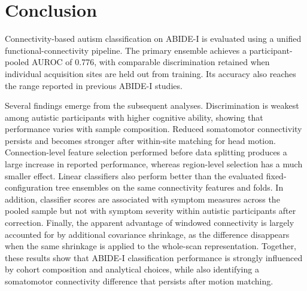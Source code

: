 \section{Conclusion}
\label{sec:conclusion}

Connectivity-based autism classification on ABIDE-I is evaluated using a unified functional-connectivity pipeline. The primary ensemble achieves a participant-pooled AUROC of 0.776, with comparable discrimination retained when individual acquisition sites are held out from training. Its accuracy also reaches the range reported in previous ABIDE-I studies.

Several findings emerge from the subsequent analyses. Discrimination is weakest among autistic participants with higher cognitive ability, showing that performance varies with sample composition. Reduced somatomotor connectivity persists and becomes stronger after within-site matching for head motion. Connection-level feature selection performed before data splitting produces a large increase in reported performance, whereas region-level selection has a much smaller effect. Linear classifiers also perform better than the evaluated fixed-configuration tree ensembles on the same connectivity features and folds. In addition, classifier scores are associated with symptom measures across the pooled sample but not with symptom severity within autistic participants after correction. Finally, the apparent advantage of windowed connectivity is largely accounted for by additional covariance shrinkage, as the difference disappears when the same shrinkage is applied to the whole-scan representation. Together, these results show that ABIDE-I classification performance is strongly influenced by cohort composition and analytical choices, while also identifying a somatomotor connectivity difference that persists after motion matching.

